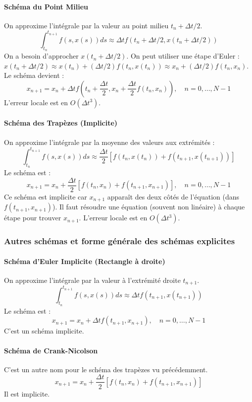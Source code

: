 \documentclass{article}
\begin{document}
\paragraph{Schéma du Point Milieu}
On approxime l'intégrale par la valeur au point milieu $t_n + \Delta t / 2$.
\[ \int_{t_n}^{t_{n+1}} f(s, x(s)) ds \approx \Delta t f(t_n + \Delta t/2, x(t_n + \Delta t/2)) \]
On a besoin d'approcher $x(t_n + \Delta t/2)$. On peut utiliser une étape d'Euler :
$x(t_n + \Delta t/2) \approx x(t_n) + (\Delta t/2) f(t_n, x(t_n)) \approx x_n + (\Delta t/2) f(t_n, x_n)$.
Le schéma devient :
\[ x_{n+1} = x_n + \Delta t f\left(t_n + \frac{\Delta t}{2}, x_n + \frac{\Delta t}{2} f(t_n, x_n)\right), \quad n=0, \dots, N-1 \]
L'erreur locale est en $O(\Delta t^3)$.

\paragraph{Schéma des Trapèzes (Implicite)}
On approxime l'intégrale par la moyenne des valeurs aux extrémités :
\[ \int_{t_n}^{t_{n+1}} f(s, x(s)) ds \approx \frac{\Delta t}{2} [f(t_n, x(t_n)) + f(t_{n+1}, x(t_{n+1}))] \]
Le schéma est :
\[ x_{n+1} = x_n + \frac{\Delta t}{2} [f(t_n, x_n) + f(t_{n+1}, x_{n+1})], \quad n=0, \dots, N-1 \]
Ce schéma est implicite car $x_{n+1}$ apparaît des deux côtés de l'équation (dans $f(t_{n+1}, x_{n+1})$). Il faut résoudre une équation (souvent non linéaire) à chaque étape pour trouver $x_{n+1}$.
L'erreur locale est en $O(\Delta t^3)$.

\subsubsection{Autres schémas et forme générale des schémas explicites} %

\paragraph{Schéma d'Euler Implicite (Rectangle à droite)}
On approxime l'intégrale par la valeur à l'extrémité droite $t_{n+1}$.
\[ \int_{t_n}^{t_{n+1}} f(s, x(s)) ds \approx \Delta t f(t_{n+1}, x(t_{n+1})) \]
Le schéma est :
\[ x_{n+1} = x_n + \Delta t f(t_{n+1}, x_{n+1}), \quad n=0, \dots, N-1 \]
C'est un schéma implicite.

\paragraph{Schéma de Crank-Nicolson}
C'est un autre nom pour le schéma des trapèzes vu précédemment.
\[ x_{n+1} = x_n + \frac{\Delta t}{2} [f(t_n, x_n) + f(t_{n+1}, x_{n+1})] \]
Il est implicite.
\end{document}
